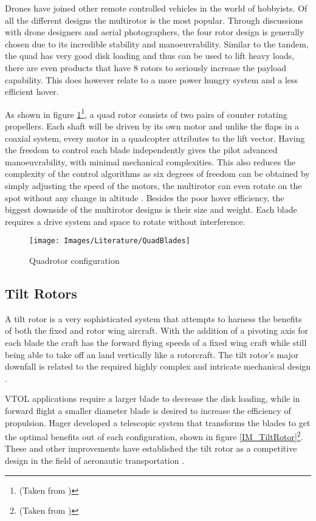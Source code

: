 Drones have joined other remote controlled vehicles in the world of hobbyists. Of all the different designs the multirotor is the most popular. Through discussions with drone designers and aerial photographers, the four rotor design is generally chosen due to its incredible stability and manoeuvrability. Similar to the tandem, the quad has very good disk loading and thus can be used to lift heavy loads, there are even products that have 8 rotors to seriously increase the payload capability. This does however relate to a more power hungry system and a less efficient hover.

As shown in figure \ref{IM_CounterBlades}\footnote{(Taken from \cite{ThrustCritical})}, a quad rotor consists of two pairs of counter rotating propellers. Each shaft will be driven by its own motor and unlike the flaps in a coaxial system, every motor in a quadcopter attributes to the lift vector. Having the freedom to control each blade independently gives the pilot advanced manoeuvrability, with minimal mechanical complexities. This also reduces the complexity of the control algorithms as six degrees of freedom can be obtained by simply adjusting the speed of the motors, the multirotor can even rotate on the spot without any change in altitude \cite{ThrustCritical}. Besides the poor hover efficiency, the biggest downside of the multirotor designs is their size and weight. Each blade requires a drive system and space to rotate without interference.

\begin{figure}[H]
\centering
\texttt{[image: Images/Literature/QuadBlades]}
\caption{Quadrotor configuration \cite{ThrustCritical}}
\label{IM_CounterBlades}
\end{figure}



\subsection{Tilt Rotors}

A tilt rotor is a very sophisticated system that attempts to harness the benefits of both the fixed and rotor wing aircraft. With the addition of a pivoting axis for each blade the craft has the forward flying speeds of a fixed wing craft while still being able to take off an land vertically like a rotorcraft. The tilt rotor's major downfall is related to the required highly complex and intricate mechanical design \cite{RotorConfig}.
 
VTOL applications require a larger blade to decrease the disk loading, while in forward flight a smaller diameter blade is desired to increase the efficiency of propulsion. Hager \cite{US6030177} developed a telescopic system that transforms the blades to get the optimal benefits out of each configuration, shown in figure \ref{IM_TiltRotor}\footnote{(Taken from \cite{Heli})}. These and other improvements have established the tilt rotor as a  competitive design in the field of aeronautic transportation \cite{RotorConfig}.

